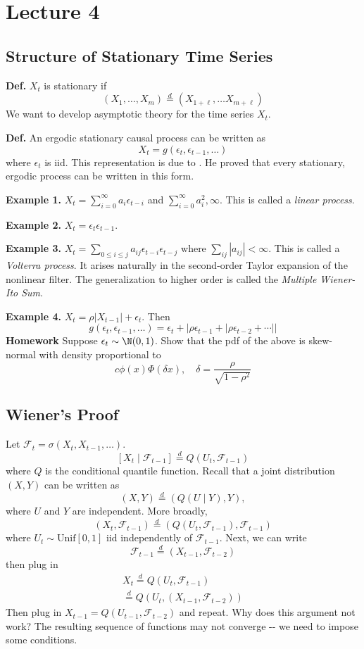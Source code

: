 \section{Lecture 4}

\subsection*{Structure of Stationary Time Series}
\textbf{Def.} \(X_t\) is stationary if
\[(X_1, \dots, X_m) \overset{d}{=} (X_{1+\ell}, \dots X_{m + \ell})\]
We want to develop asymptotic theory for the time series \(X_t\).

\textbf{Def.} An ergodic stationary causal process can be written as
\[X_t = g(\epsilon_t, \epsilon_{t-1}, \dots)\]
where \(\epsilon_t\) is iid. This representation is due to \citet{Wie56}. He proved that every stationary, ergodic process can be written in this form.

\textbf{Example 1.} \(X_t = \sum_{i=0}^\infty a_i \epsilon_{t-i}\) and \(\sum_{i=0}^\infty a_i^2 , \infty\). This is called a \emph{linear process}.

\textbf{Example 2.} \(X_t = \epsilon_t \epsilon_{t-1}\).

\textbf{Example 3.} \(X_t = \sum_{0 \leq i \leq j} a_{ij} \epsilon_{t-i}\epsilon_{t-j}\) where \(\sum_{ij} |a_{ij}| < \infty\). This is called a \emph{Volterra process}. It arises naturally in the second-order Taylor expansion of the nonlinear filter. The generalization to higher order is called the \emph{Multiple Wiener-Ito Sum}.

\textbf{Example 4.} \(X_t = \rho |X_{t-1}| + \epsilon_t\). Then
\[g(\epsilon_t, \epsilon_{t-1}, \dots) = \epsilon_t + | \rho \epsilon_{t-1} + |\rho \epsilon_{t-2} + \cdots||\]
\textbf{Homework} Suppose \(\epsilon_t \sim \N(0, 1)\). Show that the pdf of the above is skew-normal with density proportional to
\[c \phi(x)\Phi(\delta x), \quad \delta = \frac{\rho}{\sqrt{1 - \rho^2}}\]

\subsection*{Wiener's Proof}
Let \(\mathcal F_t = \sigma(X_t, X_{t-1}, \dots).\)
\[[X_t \mid \mathcal F_{t-1}] \overset{d}{=} Q(U_t, \mathcal F_{t-1})\]
where \(Q\) is the conditional quantile function. Recall that a joint distribution \((X, Y)\) can be written as
\[(X, Y) \overset{d}{=} (Q(U \mid Y), Y),\]
where \(U\) and \(Y\) are independent. More broadly,
\[(X_t, \mathcal{F}_{t-1}) \overset{d}{=} (Q(U_t, \mathcal{F}_{t-1}), \mathcal{F}_{t-1})\]
where \(U_t \sim \text{Unif}[0, 1]\) iid independently of \(\mathcal{F}_{t-1}\). Next, we can write
\[\mathcal{F}_{t-1} \overset{d}{=} (X_{t-1}, \mathcal{F}_{t-2})\]
then plug in
\[\begin{gathered}X_t \overset{d}{=} Q(U_t, \mathcal{F}_{t-1}) \\
\overset{d}{=} Q(U_t, (X_{t-1}, \mathcal{F}_{t-2}))\end{gathered}\]
Then plug in \(X_{t-1} = Q(U_{t-1}, \mathcal{F}_{t-2})\) and repeat. Why does this argument not work? The resulting sequence of functions may not converge -\/- we need to impose some conditions.

